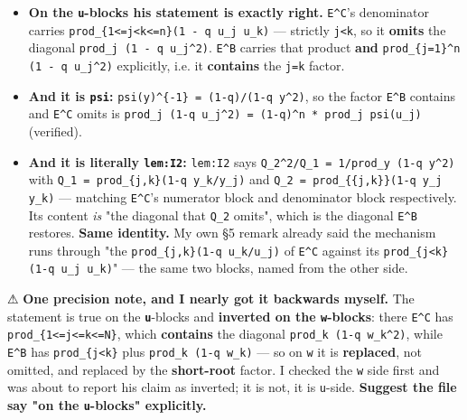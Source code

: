 \documentclass[11pt,a4paper]{article}
\begin{document}
\begin{itemize}
\item \textbf{On the \mbox{\texttt{u}}-blocks his statement is exactly right.} \mbox{\texttt{E\textasciicircum{}C}}'s denominator carries \mbox{\texttt{prod\_\{1<=j<k<=n\}(1 - q u\_j u\_k)}} --- strictly \mbox{\texttt{j<k}}, so it \textbf{omits} the diagonal \mbox{\texttt{prod\_j (1 - q u\_j\textasciicircum{}2)}}. \mbox{\texttt{E\textasciicircum{}B}} carries that product \textbf{and} \mbox{\texttt{prod\_\{j=1\}\textasciicircum{}n (1 - q u\_j\textasciicircum{}2)}} explicitly, i.e. it \textbf{contains} the \mbox{\texttt{j=k}} factor. \checkmark
\item \textbf{And it is \mbox{\texttt{psi}}:} \mbox{\texttt{psi(y)\textasciicircum{}\{-1\} = (1-q)/(1-q y\textasciicircum{}2)}}, so the factor \mbox{\texttt{E\textasciicircum{}B}} contains and \mbox{\texttt{E\textasciicircum{}C}} omits is \mbox{\texttt{prod\_j (1-q u\_j\textasciicircum{}2) = (1-q)\textasciicircum{}n * prod\_j psi(u\_j)}} (verified). \checkmark
\item \textbf{And it is literally \mbox{\texttt{lem:I2}}:} \mbox{\texttt{lem:I2}} says \mbox{\texttt{Q\_2\textasciicircum{}2/Q\_1 = 1/prod\_y (1-q y\textasciicircum{}2)}} with \mbox{\texttt{Q\_1 = prod\_\{j,k\}(1-q y\_k/y\_j)}} and \mbox{\texttt{Q\_2 = prod\_\{\{j,k\}\}(1-q y\_j y\_k)}} --- matching \mbox{\texttt{E\textasciicircum{}C}}'s numerator block and denominator block respectively. Its content \emph{is} "the diagonal that \mbox{\texttt{Q\_2}} omits", which is the diagonal \mbox{\texttt{E\textasciicircum{}B}} restores. \textbf{Same identity.} My own \S{}5 remark already said the mechanism runs through "the \mbox{\texttt{prod\_\{j,k\}(1-q u\_k/u\_j)}} of \mbox{\texttt{E\textasciicircum{}C}} against its \mbox{\texttt{prod\_\{j<k\}(1-q u\_j u\_k)}}" --- the same two blocks, named from the other side.
\end{itemize}

⚠ \textbf{One precision note, and I nearly got it backwards myself.} The statement is true on the \textbf{\mbox{\texttt{u}}}-blocks and \textbf{inverted on the \mbox{\texttt{w}}-blocks}: there \mbox{\texttt{E\textasciicircum{}C}} has \mbox{\texttt{prod\_\{1<=j<=k<=N\}}}, which \textbf{contains} the diagonal \mbox{\texttt{prod\_k (1-q w\_k\textasciicircum{}2)}}, while \mbox{\texttt{E\textasciicircum{}B}} has \mbox{\texttt{prod\_\{j<k\}}} plus \mbox{\texttt{prod\_k (1-q w\_k)}} --- so on \mbox{\texttt{w}} it is \textbf{replaced}, not omitted, and replaced by the \textbf{short-root} factor. I checked the \mbox{\texttt{w}} side first and was about to report his claim as inverted; it is not, it is \mbox{\texttt{u}}-side. \textbf{Suggest the file say "on the \mbox{\texttt{u}}-blocks" explicitly.}
\end{document}

